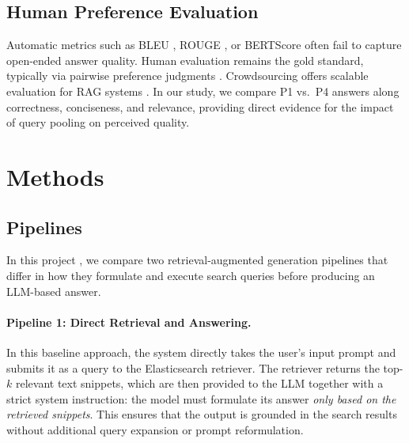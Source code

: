 \documentclass[manuscript,screen]{acmart}
\begin{document}
\begin{CCSXML}
	\subsection{Human Preference Evaluation}
	\label{subsec:human-preference-eval}
	Automatic metrics such as BLEU \cite{post-2018-call}, ROUGE \cite{lin-2004-rouge}, or BERTScore \cite{zhang2020bertscoreevaluatingtextgeneration} often fail to capture open-ended answer quality. Human evaluation remains the gold standard, typically via pairwise preference judgments \cite{bai2022traininghelpfulharmlessassistant,stiennon2022learningsummarizehumanfeedback}. Crowdsourcing offers scalable evaluation for RAG systems \cite{Gienapp_2025}. In our study, we compare P1 vs.~P4 answers along correctness, conciseness, and relevance, providing direct evidence for the impact of query pooling on perceived quality.

\section{Methods}

	\subsection{Pipelines}
	\label{subsec:pipelines}
	
	In this project \cite{repo}, we compare two retrieval-augmented generation pipelines that
	differ in how they formulate and execute search queries before producing an
	LLM-based answer.
	
	\paragraph{Pipeline 1: Direct Retrieval and Answering.}
	In this baseline approach, the system directly takes the user’s input prompt
	and submits it as a query to the Elasticsearch retriever. The retriever returns the top-$k$ relevant text
	snippets, which are then provided to the LLM together with a
	strict system instruction: the model must formulate its answer \emph{only based
	on the retrieved snippets}. This ensures that the output is grounded in the
	search results without additional query expansion or prompt reformulation.
	
	\begin{figure}[H] %
		\centering
\end{figure}
\end{CCSXML}
\end{document}
